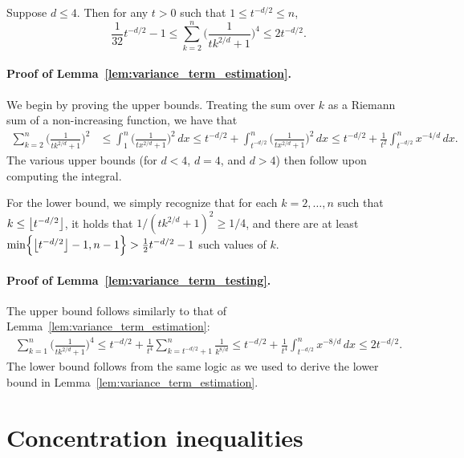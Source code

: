 \begin{lemma}
	\label{lem:variance_term_testing}
	Suppose $d \leq 4$. Then for any $t > 0$ such that $1 \leq t^{-d/2} \leq n$,
	\begin{equation*}
	\frac{1}{32}t^{-d/2} - 1 \leq \sum_{k = 2}^{n} \biggl(\frac{1}{tk^{2/d} + 1}\biggr)^4 \leq 2t^{-d/2}.
	\end{equation*}
\end{lemma}

\paragraph{Proof of Lemma~\ref{lem:variance_term_estimation}.}
We begin by proving the upper bounds. Treating the sum over $k$ as a Riemann sum of a non-increasing function, we have that
\begin{align*}
\sum_{k = 2}^{n} \biggl(\frac{1}{tk^{2/d} + 1}\biggr)^2 & \leq \int_{1}^{n} \biggl(\frac{1}{tx^{2/d} + 1}\biggr)^2 \,dx \leq t^{-d/2} + \int_{t^{-d/2}}^{n} \biggl(\frac{1}{tx^{2/d} + 1}\biggr)^2 \,dx \leq t^{-d/2} + \frac{1}{t^2} \int_{t^{-d/2}}^{n} x^{-4/d} \,dx.
\end{align*}
The various upper bounds (for $d < 4$, $d = 4$, and $d > 4$) then follow upon computing the integral.

For the lower bound, we simply recognize that for each $k = 2,\ldots,n$ such that $k \leq \left\lfloor t^{-d/2} \right\rfloor$, it holds that $1/(tk^{2/d} + 1)^2 \geq 1/4$, and there are at least $\min\Bigl\{\left\lfloor t^{-d/2} \right\rfloor - 1,n - 1\Bigr\} > \frac{1}{2}t^{-d/2} - 1$ such values of $k$.

\paragraph{Proof of Lemma~\ref{lem:variance_term_testing}.}
The upper bound follows similarly to that of Lemma~\ref{lem:variance_term_estimation}:
\begin{align*}
\sum_{k = 1}^{n} \biggl(\frac{1}{tk^{2/d} + 1}\biggr)^4 \leq t^{-d/2} + \frac{1}{t^4}\sum_{k = t^{-d/2} + 1}^{n} \frac{1}{k^{8/d}} \leq t^{-d/2} + \frac{1}{t^4} \int_{t^{-d/2}}^{n} x^{-8/d} \,dx \leq 2t^{-d/2}.
\end{align*}
The lower bound follows from the same logic as we used to derive the lower bound in Lemma~\ref{lem:variance_term_estimation}.

\section{Concentration inequalities}

